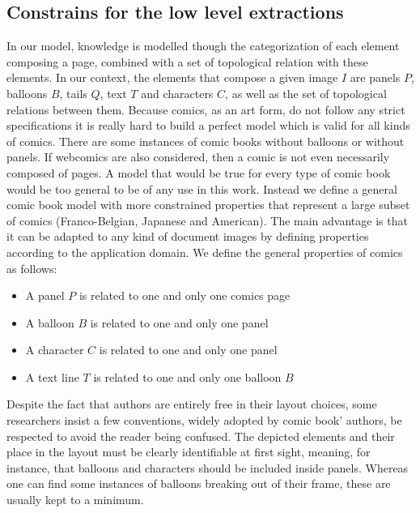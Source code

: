 \subsection{Constrains for the low level extractions} %
\label{sec:kn:constrains_low_level_extraction}
In our model, knowledge is modelled though the categorization of each element composing a page, combined with a set of topological relation with these elements.
In our context, the elements that compose a given image $I$ are panels $P$, balloons $B$, tails $Q$, text $T$ and characters $C$, as well as the set of topological relations between them.
Because comics, as an art form, do not follow any strict specifications it is really hard to build a perfect model which is valid for all kinds of comics.
There are some instances of comic books without balloons or without panels.
If webcomics are also considered, then a comic is not even necessarily composed of pages.
A model that would be true for every type of comic book would be too general to be of any use in this work.
Instead we define a general comic book model with more constrained properties that represent a large subset of comics (Franco-Belgian, Japanese and American).
The main advantage is that it can be adapted to any kind of document images by defining properties according to the application domain.
We define the general properties of comics as follows:

\begin{itemize}
  \item A panel $P$ is related to one and only one comics page
  \item A balloon $B$ is related to one and only one panel
  \item A character $C$ is related to one and only one panel
  \item A text line $T$ is related to one and only one balloon $B$
\end{itemize}

Despite the fact that authors are entirely free in their layout choices, some researchers insist a few conventions, widely adopted by comic book' authors, be respected to avoid the reader being confused\cite{Laine2010,Duc1982}.
The depicted elements and their place in the layout must be clearly identifiable at first sight, meaning, for instance, that balloons and characters should be included inside panels.
Whereas one can find some instances of balloons breaking out of their frame, these are usually kept to a minimum.

